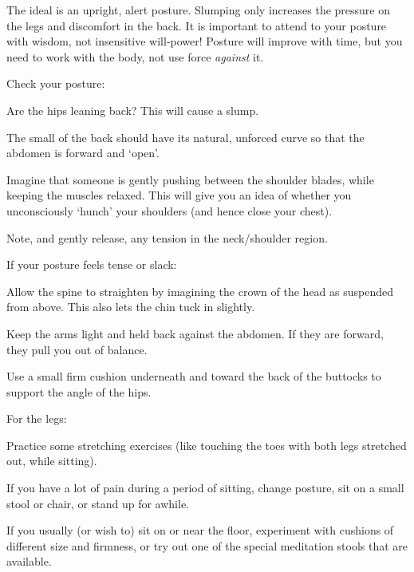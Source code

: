 
The ideal is an upright, alert posture. Slumping only increases the
pressure on the legs and discomfort in the back. It is important to
attend to your posture with wisdom, not insensitive will-power! Posture
will improve with time, but you need to work with the body, not use
force \emph{against} it.

Check your posture:
\begin{packeditemize}
\item
  Are the hips leaning back? This will cause a slump.
\item
  The small of the back should have its natural, unforced curve so that
  the abdomen is forward and `open'.
\item
  Imagine that someone is gently pushing between the shoulder blades,
  while keeping the muscles relaxed. This will give you an idea of
  whether you unconsciously `hunch' your shoulders (and hence close your
  chest).
\item
  Note, and gently release, any tension in the neck/shoulder region.
\end{packeditemize}

\newpage

If your posture feels tense or slack:
\begin{packeditemize}
\item
  Allow the spine to straighten by imagining the crown of the head as
  suspended from above. This also lets the chin tuck in slightly.
\item
  Keep the arms light and held back against the abdomen. If they are
  forward, they pull you out of balance.
\item
  Use a small firm cushion underneath and toward the back of the
  buttocks to support the angle of the hips.
\end{packeditemize}

For the legs:
\begin{packeditemize}
\item
  Practice some stretching exercises (like touching the toes with both
  legs stretched out, while sitting).
\item
  If you have a lot of pain during a period of sitting, change posture,
  sit on a small stool or chair, or stand up for awhile.
\item
  If you usually (or wish to) sit on or near the floor, experiment with
  cushions of different size and firmness, or try out one of the special
  meditation stools that are available.
\end{packeditemize}

